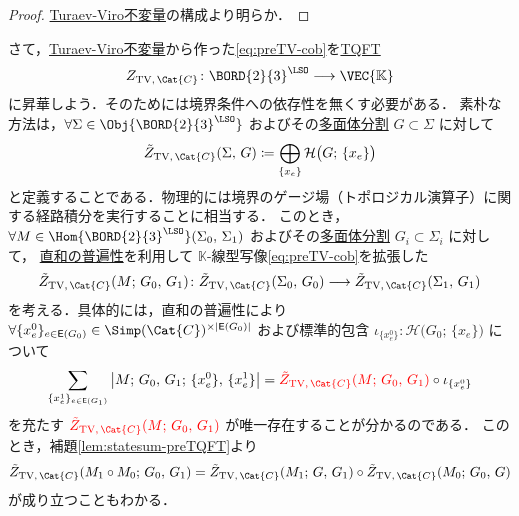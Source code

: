 \documentclass[TQFT_main]{subfiles}
\begin{document}
\begin{proof}
    \hyperref[def:TV-bdy]{Turaev-Viro不変量}の構成より明らか．
\end{proof}

さて，\hyperref[def:TV-bdy]{Turaev-Viro不変量}から作った\eqref{eq:preTV-cob}を\hyperref[def:TQFT]{TQFT}
\begin{align}
    Z_{\text{TV},\, \Cat{C}} \colon \BORD{2}{3}^{\LSO} \lto \VEC{\mathbb{K}}
\end{align}
に昇華しよう．そのためには境界条件への依存性を無くす必要がある．
素朴な方法は，$\forall \Sigma \in \Obj{\BORD{2}{3}^{\LSO}}$ およびその\hyperref[def:skeleton-2mfd]{多面体分割} $G \subset \Sigma$ に対して
\begin{align}
    \tilde{Z}_{\text{TV},\, \Cat{C}} (\Sigma,\, G) \coloneqq \bigoplus_{\{x_e\}} \mathcal{H} \bigl( G;\, \{x_e\} \bigr) 
\end{align}
と定義することである．物理的には境界のゲージ場（トポロジカル演算子）に関する経路積分を実行することに相当する．
このとき， $\forall M \in \Hom{\BORD{2}{3}^{\LSO}}(\Sigma_0,\, \Sigma_1)$ およびその\hyperref[def:skeleton-2mfd]{多面体分割} $G_i \subset \Sigma_i$ に対して，
\hyperref[def:lim-colim]{直和の普遍性}を利用して $\mathbb{K}$-線型写像\eqref{eq:preTV-cob}を拡張した
\begin{align}
    \tilde{Z}_{\text{TV},\, \Cat{C}} (M;\, G_0,\, G_1) \colon \tilde{Z}_{\text{TV},\, \Cat{C}} (\Sigma_0,\, G_0) \lto \tilde{Z}_{\text{TV},\, \Cat{C}} (\Sigma_1,\, G_1)
\end{align}
を考える．具体的には，直和の普遍性により $\forall \{x^0_e\}_{e \in \mathsf{E} (G_0)} \in \Simp(\Cat{C})^{\times \abs{\mathsf{E} (G_0)}}$ および標準的包含 $\iota_{\{x^0_e\}} \colon \mathcal{H} \bigl( G_0;\, \{x_e\} \bigr)$ について
\begin{align}
    \sum_{\{x^1_e\}_{e \in \mathsf{E} (G_1)}} \abs{M;\, G_0,\, G_1;\, \{x^0_e\},\, \{x^1_e\}} = \textcolor{red}{\tilde{Z}_{\text{TV},\, \Cat{C}} (M;\, G_0,\, G_1)} \circ \iota_{\{x^0_e\}}
\end{align}
を充たす $\textcolor{red}{\tilde{Z}_{\text{TV},\, \Cat{C}} (M;\, G_0,\, G_1)}$ が唯一存在することが分かるのである．
このとき，補題\ref{lem:statesum-preTQFT}より
\begin{align}
    \tilde{Z}_{\text{TV},\, \Cat{C}} (M_1 \circ M_0;\, G_0,\, G_1) = \tilde{Z}_{\text{TV},\, \Cat{C}} (M_1;\, G,\, G_1) \circ \tilde{Z}_{\text{TV},\, \Cat{C}} (M_0;\, G_0,\, G)
\end{align}
が成り立つこともわかる．
\end{document}
